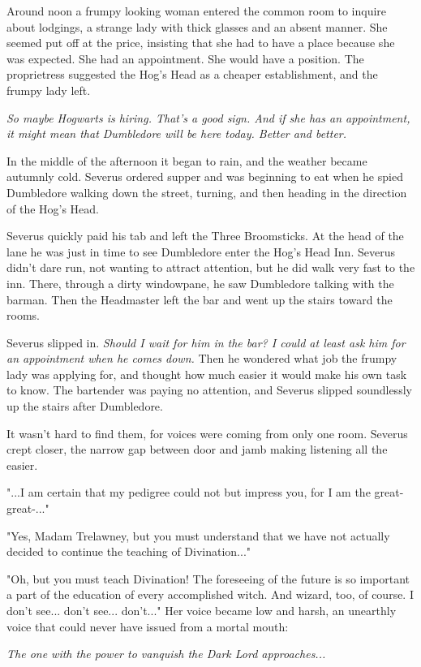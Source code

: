 \documentclass[a4paper,11pt]{article}
\begin{document}
Around noon a frumpy looking woman entered the common room to inquire about lodgings, a strange lady with thick glasses and an absent manner. She seemed put off at the price, insisting that she had to have a place because she was expected. She had an appointment. She would have a position. The proprietress suggested the Hog's Head as a cheaper establishment, and the frumpy lady left.

\emph{So maybe Hogwarts is hiring. That's a good sign. And if she has an appointment, it might mean that Dumbledore will be here today. Better and better.}

In the middle of the afternoon it began to rain, and the weather became autumnly cold. Severus ordered supper and was beginning to eat when he spied Dumbledore walking down the street, turning, and then heading in the direction of the Hog's Head.

Severus quickly paid his tab and left the Three Broomsticks. At the head of the lane he was just in time to see Dumbledore enter the Hog's Head Inn. Severus didn't dare run, not wanting to attract attention, but he did walk very fast to the inn. There, through a dirty windowpane, he saw Dumbledore talking with the barman. Then the Headmaster left the bar and went up the stairs toward the rooms.

Severus slipped in. \emph{Should I wait for him in the bar? I could at least ask him for an appointment when he comes down.} Then he wondered what job the frumpy lady was applying for, and thought how much easier it would make his own task to know. The bartender was paying no attention, and Severus slipped soundlessly up the stairs after Dumbledore.

It wasn't hard to find them, for voices were coming from only one room. Severus crept closer, the narrow gap between door and jamb making listening all the easier.

"...I am certain that my pedigree could not but impress you, for I am the great-great-..."

"Yes, Madam Trelawney, but you must understand that we have not actually decided to continue the teaching of Divination..."

"Oh, but you must teach Divination! The foreseeing of the future is so important a part of the education of every accomplished witch. And wizard, too, of course. I don't see... don't see... don't..." Her voice became low and harsh, an unearthly voice that could never have issued from a mortal mouth:

\emph{The one with the power to vanquish the Dark Lord approaches...}
\end{document}
